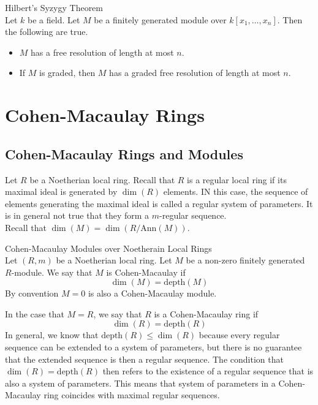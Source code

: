 \documentclass[a4paper]{article}
\begin{document}
\begin{thm}{Hilbert's Syzygy Theorem}{}\\
Let $k$ be a field. Let $M$ be a finitely generated module over $k[x_1,\dots,x_n]$. Then the following are true. 
\begin{itemize}
\item $M$ has a free resolution of length at most $n$. 
\item If $M$ is graded, then $M$ has a graded free resolution of length at most $n$. 
\end{itemize}
\end{thm}

\pagebreak
\section{Cohen-Macaulay Rings}
\subsection{Cohen-Macaulay Rings and Modules}
Let $R$ be a Noetherian local ring. Recall that $R$ is a regular local ring if its maximal ideal is generated by $\dim(R)$ elements. IN this case, the sequence of elements generating the maximal ideal is called a regular system of parameters. It is in general not true that they form a $m$-regular sequence. \\

Recall that $\dim(M)=\dim(R/\text{Ann}(M))$. 

\begin{defn}{Cohen-Macaulay Modules over Noetherain Local Rings}{}\\
Let $(R,m)$ be a Noetherian local ring. Let $M$ be a non-zero finitely generated $R$-module. We say that $M$ is Cohen-Macaulay if $$\dim(M)=\text{depth}(M)$$ By convention $M=0$ is also a Cohen-Macaulay module. 
\end{defn}

In the case that $M=R$, we say that $R$ is a Cohen-Macaulay ring if $$\dim(R)=\text{depth}(R)$$ In general, we know that $\text{depth}(R)\leq\dim(R)$ because every regular sequence can be extended to a system of parameters, but there is no guarantee that the extended sequence is then a regular sequence. The condition that $\dim(R)=\text{depth}(R)$ then refers to the existence of a regular sequence that is also a system of parameters. This means that system of parameters in a Cohen-Macaulay ring coincides with maximal regular sequences. \\
\end{document}
